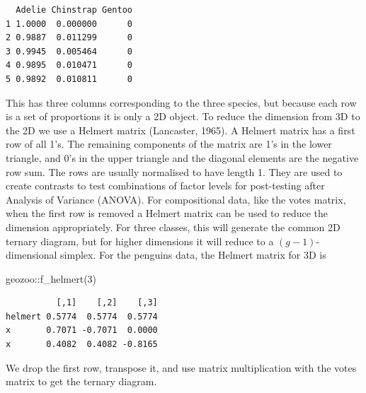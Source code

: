 \documentclass[
  letterpaper,
]{krantz}
\newenvironment{Shaded}{\begin{snugshade}}{\end{snugshade}}
\newcommand{\DecValTok}[1]{\textcolor[rgb]{0.68,0.00,0.00}{#1}}
\newcommand{\FunctionTok}[1]{\textcolor[rgb]{0.28,0.35,0.67}{#1}}
\newcommand{\NormalTok}[1]{\textcolor[rgb]{0.00,0.23,0.31}{#1}}
\newcommand{\SpecialCharTok}[1]{\textcolor[rgb]{0.37,0.37,0.37}{#1}}
\begin{document}
\begin{Shaded}
\end{Shaded}

\begin{verbatim}
  Adelie Chinstrap Gentoo
1 1.0000  0.000000      0
2 0.9887  0.011299      0
3 0.9945  0.005464      0
4 0.9895  0.010471      0
5 0.9892  0.010811      0
\end{verbatim}

This has three columns corresponding to the three species, but because
each row is a set of proportions it is only a 2D object. To reduce the
dimension from 3D to the 2D we use a Helmert matrix (Lancaster, 1965). A
Helmert matrix has a first row of all 1's. The remaining components of
the matrix are 1's in the lower triangle, and 0's in the upper triangle
and the diagonal elements are the negative row sum. The rows are usually
normalised to have length 1. They are used to create contrasts to test
combinations of factor levels for post-testing after Analysis of
Variance (ANOVA). For compositional data, like the votes matrix, when
the first row is removed a Helmert matrix can be used to reduce the
dimension appropriately. For three classes, this will generate the
common 2D ternary diagram, but for higher dimensions it will reduce to a
\((g-1)\)-dimensional simplex. For the penguins data, the Helmert matrix
for 3D is 

\begin{Shaded}
\begin{Highlighting}[]
\NormalTok{geozoo}\SpecialCharTok{::}\FunctionTok{f\_helmert}\NormalTok{(}\DecValTok{3}\NormalTok{)}
\end{Highlighting}
\end{Shaded}

\begin{verbatim}
          [,1]    [,2]    [,3]
helmert 0.5774  0.5774  0.5774
x       0.7071 -0.7071  0.0000
x       0.4082  0.4082 -0.8165
\end{verbatim}

We drop the first row, transpose it, and use matrix multiplication with
the votes matrix to get the ternary diagram.

\end{document}

